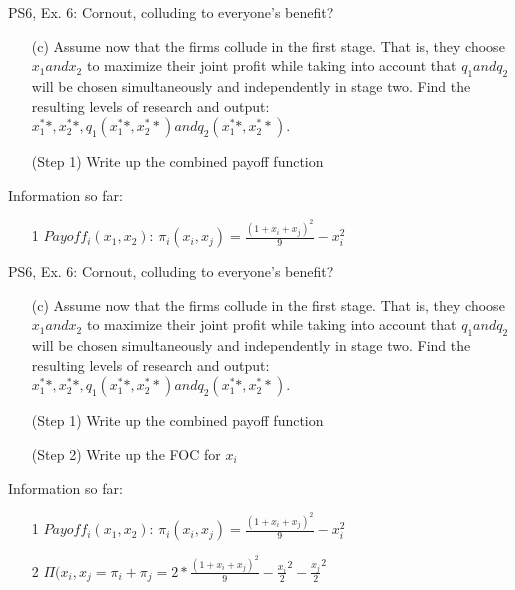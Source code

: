 \begin{frame}{PS6, Ex. 6: Cornout, colluding to everyone's benefit?}
    \begin{itemize}
    \item[(c)] Assume now that the firms collude in the first stage. That is, they choose $x_1 and x_2$ to maximize their joint profit while taking into account that $q_1 and q_2$ will be chosen simultaneously and independently in stage two. Find the resulting levels of research and output: $x_1^**,x_2^**,q_1(x_1^**,x_2^**) and q_2(x_1^**,x_2^**)$.
    \end{itemize}
    \vfill\null
  \begin{multicols}{2}
    \begin{itemize}
      \item[(Step 1)] Write up the combined payoff function
    \end{itemize}
    \vfill\null \columnbreak
    Information so far:
    \begin{itemize}
    \item[1] $Payoff_i(x_1,x_2)$: $\pi_i(x_i,x_j) = \frac{(1+x_i+x_j)^2}{9}-x_i^2 $
    \end{itemize}
    \vfill\null
  \end{multicols}
\end{frame}

\begin{frame}{PS6, Ex. 6: Cornout, colluding to everyone's benefit?}
    \begin{itemize}
    \item[(c)] Assume now that the firms collude in the first stage. That is, they choose $x_1 and x_2$ to maximize their joint profit while taking into account that $q_1 and q_2$ will be chosen simultaneously and independently in stage two. Find the resulting levels of research and output: $x_1^**,x_2^**,q_1(x_1^**,x_2^**) and q_2(x_1^**,x_2^**)$.
    \end{itemize}
    \vfill\null
  \begin{multicols}{2}
    \begin{itemize}
      \item[(Step 1)] Write up the combined payoff function
      \item[(Step 2)] Write up the FOC for $x_i$
    \end{itemize}
    \vfill\null \columnbreak
    Information so far:
    \begin{itemize}
    \item[1] $Payoff_i(x_1,x_2)$: $\pi_i(x_i,x_j) = \frac{(1+x_i+x_j)^2}{9}-x_i^2 $
    \item[2] $\Pi(x_i,x_j= \pi_i + \pi_j = 2*\frac{(1+x_i+x_j)^2}{9}-\frac{x_i}{2}^2-\frac{x_j}{2}^2 $
    \end{itemize}
    \vfill\null
  \end{multicols}
\end{frame}

